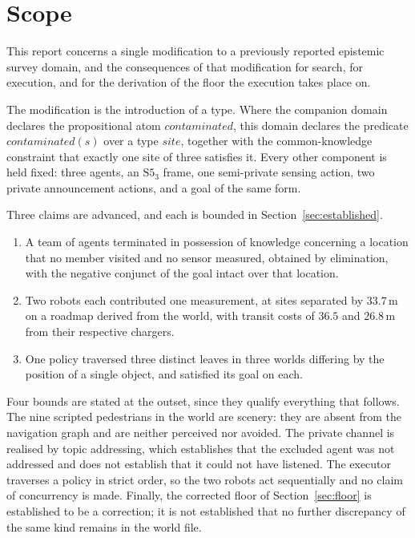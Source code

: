 \documentclass[11pt,a4paper]{article}
\theoremstyle{definition}
\begin{document}
\section{Scope}
\label{sec:scope}

This report concerns a single modification to a previously reported epistemic
survey domain, and the consequences of that modification for search, for
execution, and for the derivation of the floor the execution takes place on.

The modification is the introduction of a type. Where the companion domain
declares the propositional atom $\mathit{contaminated}$, this domain declares
the predicate $\mathit{contaminated}(s)$ over a type $\mathit{site}$, together
with the common-knowledge constraint that exactly one site of three satisfies
it. Every other component is held fixed: three agents, an $\mathrm{S5}_3$
frame, one semi-private sensing action, two private announcement actions, and a
goal of the same form.

Three claims are advanced, and each is bounded in
Section~\ref{sec:established}.

\begin{enumerate}[leftmargin=1.4em, itemsep=2pt]
  \item A team of agents terminated in possession of knowledge concerning a
        location that no member visited and no sensor measured, obtained by
        elimination, with the negative conjunct of the goal intact over that
        location.
  \item Two robots each contributed one measurement, at sites separated by
        \(33.7\)\,m on a roadmap derived from the world, with transit costs of
        \(36.5\) and \(26.8\)\,m from their respective chargers.
  \item One policy traversed three distinct leaves in three worlds differing by
        the position of a single object, and satisfied its goal on each.
\end{enumerate}

Four bounds are stated at the outset, since they qualify everything that
follows. The nine scripted pedestrians in the world are scenery: they are
absent from the navigation graph and are neither perceived nor avoided. The
private channel is realised by topic addressing, which establishes that the
excluded agent was not addressed and does not establish that it could not have
listened. The executor traverses a policy in strict order, so the two robots
act sequentially and no claim of concurrency is made. Finally, the corrected
floor of Section~\ref{sec:floor} is established to be a correction; it is not
established that no further discrepancy of the same kind remains in the world
file.
\end{document}
